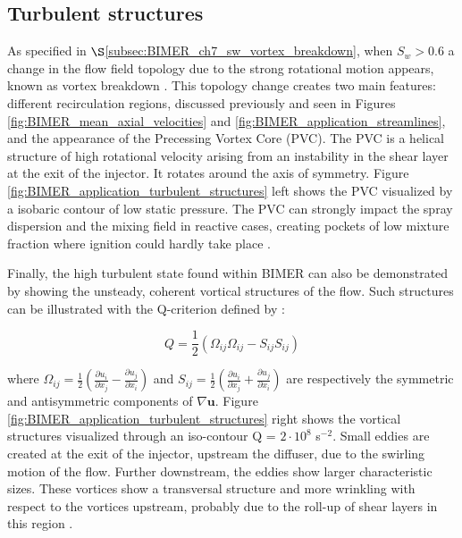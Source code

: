 \clearpage

\subsection{Turbulent structures}

As specified in $\S$\ref{subsec:BIMER_ch7_sw_vortex_breakdown}, when $S_w > 0.6$ a change in the flow field topology due to the strong rotational motion appears, known as vortex breakdown . This topology change creates two main features: different recirculation regions, discussed previously and seen in Figures \ref{fig:BIMER_mean_axial_velocities} and \ref{fig:BIMER_application_streamlines}, and the appearance of the Precessing Vortex Core (PVC). The PVC is a helical structure of high rotational velocity arising from an instability in the shear layer at the exit of the injector. It rotates around the axis of symmetry. Figure \ref{fig:BIMER_application_turbulent_structures} left shows the PVC visualized by a isobaric contour of low static pressure. The PVC can strongly impact the spray dispersion and the mixing field in reactive cases, creating pockets of low mixture fraction where ignition could hardly take place .

Finally, the high turbulent state found within BIMER can also be demonstrated by showing the unsteady, coherent vortical structures of the flow. Such structures can be illustrated with the Q-criterion defined by :

\begin{equation}
Q = \frac{1}{2} \left( \Omega_{ij} \Omega_{ij} - S_{ij} S_{ij} \right)
\end{equation}

where $\Omega_{ij} = \frac{1}{2} \left( \frac{\partial u_i}{\partial x_j} - \frac{\partial u_j}{\partial x_i} \right)$ and $S_{ij} = \frac{1}{2} \left( \frac{\partial u_i}{\partial x_j} + \frac{\partial u_j}{\partial x_i} \right)$ are respectively the symmetric and antisymmetric components of $\nabla \textbf{u}$. Figure \ref{fig:BIMER_application_turbulent_structures} right shows the vortical structures visualized through an iso-contour Q = $2 \cdot 10^8$ s$^{-2}$. Small eddies are created at the exit of the injector, upstream the diffuser, due to the swirling motion of the flow. Further downstream, the eddies show larger characteristic sizes. These vortices show a transversal structure and more wrinkling with respect to the vortices upstream, probably due to the roll-up of shear layers in this region .

